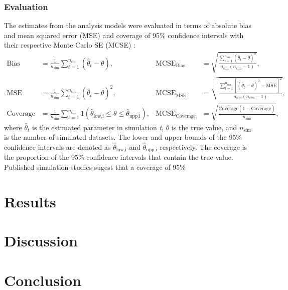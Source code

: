 \documentclass[10pt, a4paper, titlepage]{article}
\begin{document}
\subsubsection{Evaluation}
The estimates from the analysis models were evaluated in terms of absolute bias and mean squared error (MSE) and coverage of 95\% confidence intervals with their respective Monte Carlo SE (MCSE) \citep{morris2019}:
\begin{align}
    \text{Bias} &= \frac{1}{n_{\text{sim}}} \sum_{t=1}^{n_{\text{sim}}} (\hat{\theta}_t - \theta), &
    \text{MCSE}_{\text{Bias}} &= \sqrt{\frac{\sum_{t=1}^{n_{\text{sim}}} (\hat{\theta}_t - \bar{\theta})^2}{n_{\text{sim}}(n_{\text{sim}}-1)}}, \label{eq:bias} \\
    \text{MSE} &= \frac{1}{n_{\text{sim}}} \sum_{t=1}^{n_{\text{sim}}} (\hat{\theta}_t - \theta)^{2}, &
    \text{MCSE}_{\text{MSE}} &= \sqrt{\frac{\sum_{t=1}^{n_{\text{sim}}} [(\hat{\theta}_t - \theta)^2 - \hat{\text{MSE}}]^2}{n_{\text{sim}}(n_{\text{sim}}-1)}}, \label{eq:mse}\\
    \text{Coverage} &= \frac{1}{n_{\text{sim}}} \sum_{t=1}^{n_{\text{sim}}} 1(\hat{\theta}_{\text{low,i}} \leq \theta \leq \hat{\theta}_{\text{upp,i}}), &
    \text{MCSE}_{\text{Coverage}} &= \sqrt{\frac{\hat{\text{Coverage}}(1-\hat{\text{Coverage}})}{n_{\text{sim}}}}, \label{eq:coverage}
\end{align} where $\hat{\theta}_t$ is the estimated parameter in simulation \textit{t}, $\theta$ is the true value, and $n_{\text{sim}}$ is the number of simulated datasets. The lower and upper bounds of the 95\% confidence intervals are denoted as $\hat{\theta}_{\text{low,i}}$ and $\hat{\theta}_{\text{upp,i}}$ respectively. The coverage is the proportion of the 95\% confidence intervals that contain the true value. Published simulation studies sugest that a coverage of 95\%  


\section{Results}

\section{Discussion}

\section{Conclusion}
\end{document}
